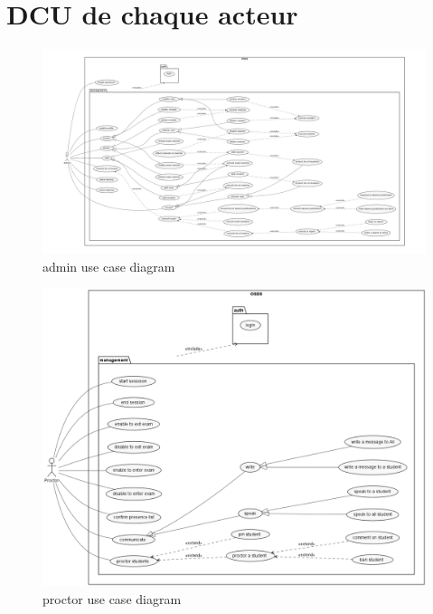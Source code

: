 \documentclass[a4paper,12p]{article}
\begin{document}
     \section{DCU de chaque acteur}
     \vspace{5cm} %

    \begin{figure}[h]
        \centering
        \includegraphics[width=\textwidth]{admin_UCD}
        \caption{admin use case diagram}
    \end{figure}

     \begin{figure}[h]
         \centering
         \includegraphics[width=\textwidth]{proctor_UCD}
         \caption{proctor use case diagram}
     \end{figure}
\end{document}
